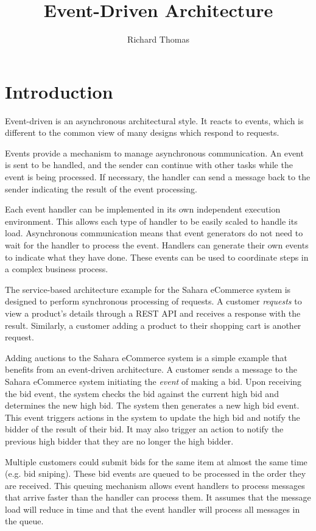 \title{Event-Driven Architecture}
\author{Richard Thomas}
\date{}

\maketitle

\section{Introduction}

Event-driven is an asynchronous architectural style.
It reacts to events, which is different to the common view of many designs which respond to requests.

Events provide a mechanism to manage asynchronous communication.
An event is sent to be handled, and the sender can continue with other tasks while the event is being processed.
If necessary, the handler can send a message back to the sender indicating the result of the event processing.

Each event handler can be implemented in its own independent execution environment.
This allows each type of handler to be easily scaled to handle its load.
Asynchronous communication means that event generators do not need to wait for the handler to process the event.
Handlers can generate their own events to indicate what they have done.
These events can be used to coordinate steps in a complex business process.

The service-based architecture example for the Sahara eCommerce system is designed to perform synchronous processing of requests.
A customer \emph{requests} to view a product's details through a REST API and receives a response with the result.
Similarly, a customer adding a product to their shopping cart is another request.

Adding auctions to the Sahara eCommerce system is a simple example that benefits from an event-driven architecture.
A customer sends a message to the Sahara eCommerce system initiating the \emph{event} of making a bid.
Upon receiving the bid event, the system checks the bid against the current high bid and determines the new high bid.
The system then generates a new high bid event.
This event triggers actions in the system to update the high bid and notify the bidder of the result of their bid.
It may also trigger an action to notify the previous high bidder that they are no longer the high bidder.

Multiple customers could submit bids for the same item at almost the same time (e.g. bid sniping).
These bid events are queued to be processed in the order they are received.
This queuing mechanism allows event handlers to process messages that arrive faster than the handler can process them.
It assumes that the message load will reduce in time and that the event handler will process all messages in the queue.


